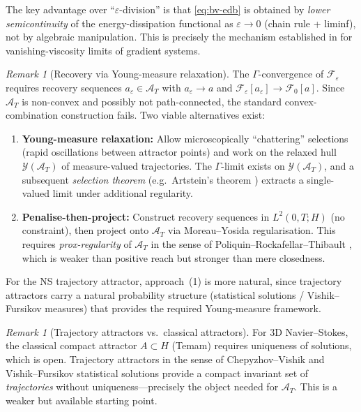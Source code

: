 \documentclass[12pt,a4paper]{article}
\theoremstyle{definition}
\theoremstyle{plain}
\theoremstyle{remark}
\newtheorem{remark}[definition]{Remark}
\begin{document}
The key advantage over ``$\varepsilon$-division'' is that \eqref{eq:bv-edb} is obtained by \emph{lower semicontinuity} of the energy-dissipation functional as $\varepsilon \to 0$ (chain rule + liminf), not by algebraic manipulation. This is precisely the mechanism established in \cite{MielkeRossiSavare2016} for vanishing-viscosity limits of gradient systems.

\begin{remark}[Recovery via Young-measure relaxation]\label{rem:young-measure}
The $\Gamma$-convergence of $\mathcal{F}_\varepsilon$ requires recovery sequences $a_\varepsilon \in \mathcal{A}_T$ with $a_\varepsilon \to a$ and $\mathcal{F}_\varepsilon[a_\varepsilon] \to \mathcal{F}_0[a]$. Since $\mathcal{A}_T$ is non-convex and possibly not path-connected, the standard convex-combination construction fails. Two viable alternatives exist:
\begin{enumerate}
\item \textbf{Young-measure relaxation:} Allow microscopically ``chattering'' selections (rapid oscillations between attractor points) and work on the relaxed hull $\mathcal{Y}(\mathcal{A}_T)$ of measure-valued trajectories. The $\Gamma$-limit exists on $\mathcal{Y}(\mathcal{A}_T)$, and a subsequent \emph{selection theorem} (e.g.\ Artstein's theorem \cite{Artstein1995}) extracts a single-valued limit under additional regularity.
\item \textbf{Penalise-then-project:} Construct recovery sequences in $L^2(0,T;H)$ (no constraint), then project onto $\mathcal{A}_T$ via Moreau--Yosida regularisation. This requires \emph{prox-regularity} of $\mathcal{A}_T$ in the sense of Poliquin--Rockafellar--Thibault \cite{PoliquinRockafellarThibault2000}, which is weaker than positive reach but stronger than mere closedness.
\end{enumerate}
For the NS trajectory attractor, approach~(1) is more natural, since trajectory attractors carry a natural probability structure (statistical solutions / Vishik--Fursikov measures) that provides the required Young-measure framework.
\end{remark}

\begin{remark}[Trajectory attractors vs.\ classical attractors]\label{rem:trajectory-attractor}
For 3D Navier--Stokes, the classical compact attractor $A \subset H$ (Temam) requires uniqueness of solutions, which is open. Trajectory attractors in the sense of Chepyzhov--Vishik \cite{ChepyzhovVishik2002} and Vishik--Fursikov statistical solutions provide a compact invariant set of \emph{trajectories} without uniqueness---precisely the object needed for $\mathcal{A}_T$. This is a weaker but available starting point.
\end{remark}
\end{document}

